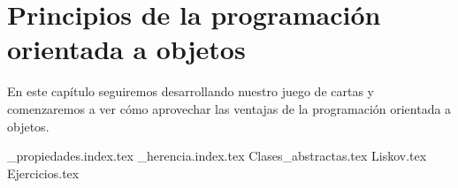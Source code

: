 \chapter{Principios de la programación orientada a objetos}
  En este capítulo seguiremos desarrollando nuestro juego de cartas y comenzaremos a ver cómo
  aprovechar las ventajas de la programación orientada a objetos.

  {_propiedades.index.tex}
  {_herencia.index.tex}
  {Clases_abstractas.tex}
  {Liskov.tex}
  {Ejercicios.tex}
  \printbibliography[keyword=oop2]